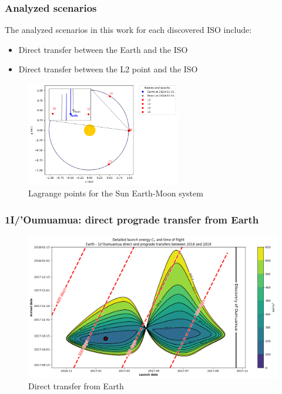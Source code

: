 \documentclass[xcolor={dvipsnames}]{beamer}
\begin{document}
\begin{frame}
\frametitle{Analyzed scenarios}

The analyzed scenarios in this work for each discovered ISO include:

\vspace{0.25cm}
\begin{itemize}
    \item Direct transfer between the Earth and the ISO
    \item Direct transfer between the L2 point and the ISO
\end{itemize}

\pause

\begin{figure}[h]
    \centering
    \includegraphics[width=0.6\textwidth]{fig/static/lagrange_points.png}
    \caption{Lagrange points for the Sun Earth-Moon system}
    \label{fig:lagrange}
\end{figure}

\end{frame}

\begin{frame}
\frametitle{1I/'Oumuamua: direct prograde transfer from Earth}

\begin{figure}[h]
    \centering
    \includegraphics[width=\textwidth]{fig/static/oumuamua/direct-detailed-porkchop-tof.png}
    \caption{Direct transfer from Earth}
    \label{fig:oumuamua-earth-transfer}
\end{figure}

\end{frame}
\end{document}

